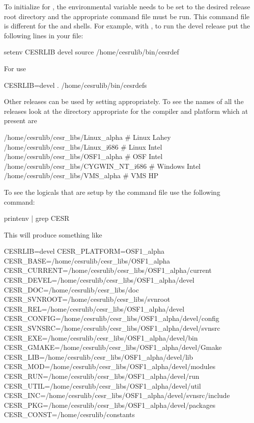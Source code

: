 To initialize for \bmad, the  environmental variable needs
to be set to the desired release root directory and the appropriate
command file must be run. This command file is different for the
 and  shells. For example, with , to run
the devel release put the following lines in your  file:
\begin{example}
  setenv CESRLIB devel
  source /home/cesrulib/bin/cesrdef
\end{example}
For  use
\begin{example}
    CESRLIB=devel
    . /home/cesrulib/bin/cesrdefs
\end{example}
Other releases can be used by setting  appropriately. To
see the names of all the releases look at the directory appropriate
for the compiler and platform which at present are
\begin{example}
  /home/cesrulib/cesr_libs/Linux_alpha       # Linux    Lahey
  /home/cesrulib/cesr_libs/Linux_i686        # Linux    Intel
  /home/cesrulib/cesr_libs/OSF1_alpha        # OSF      Intel
  /home/cesrulib/cesr_libs/CYGWIN_NT_i686    # Windows  Intel
  /home/cesrulib/cesr_libs/VMS_alpha         # VMS      HP
\end{example}

To see the logicals that are setup by the  command file
use the following command:
\begin{example}
  printenv | grep CESR
\end{example}
This will produce something like
\begin{example}
  CESRLIB=devel
  CESR_PLATFORM=OSF1_alpha
  CESR_BASE=/home/cesrulib/cesr_libs/OSF1_alpha
  CESR_CURRENT=/home/cesrulib/cesr_libs/OSF1_alpha/current
  CESR_DEVEL=/home/cesrulib/cesr_libs/OSF1_alpha/devel
  CESR_DOC=/home/cesrulib/cesr_libs/doc
  CESR_SVNROOT=/home/cesrulib/cesr_libs/svnroot
  CESR_REL=/home/cesrulib/cesr_libs/OSF1_alpha/devel
  CESR_CONFIG=/home/cesrulib/cesr_libs/OSF1_alpha/devel/config
  CESR_SVNSRC=/home/cesrulib/cesr_libs/OSF1_alpha/devel/svnsrc
  CESR_EXE=/home/cesrulib/cesr_libs/OSF1_alpha/devel/bin
  CESR_GMAKE=/home/cesrulib/cesr_libs/OSF1_alpha/devel/Gmake
  CESR_LIB=/home/cesrulib/cesr_libs/OSF1_alpha/devel/lib
  CESR_MOD=/home/cesrulib/cesr_libs/OSF1_alpha/devel/modules
  CESR_RUN=/home/cesrulib/cesr_libs/OSF1_alpha/devel/run
  CESR_UTIL=/home/cesrulib/cesr_libs/OSF1_alpha/devel/util
  CESR_INC=/home/cesrulib/cesr_libs/OSF1_alpha/devel/svnsrc/include
  CESR_PKG=/home/cesrulib/cesr_libs/OSF1_alpha/devel/packages
  CESR_CONST=/home/cesrulib/constants
\end{example}


